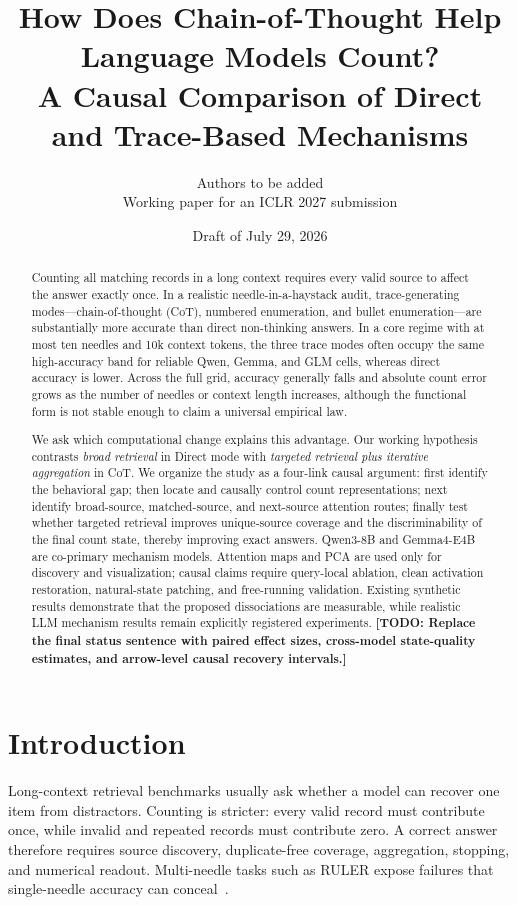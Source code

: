 \documentclass[11pt]{article}
\title{How Does Chain-of-Thought Help Language Models Count?\\
A Causal Comparison of Direct and Trace-Based Mechanisms}
\author{Authors to be added\\\small Working paper for an ICLR 2027 submission}
\date{Draft of July 29, 2026}
\newcommand{\inlineTODO}[1]{\textcolor{todored}{\textbf{[TODO: #1]}}}
\begin{document}
\maketitle

\begin{abstract}
Counting all matching records in a long context requires every valid source to affect the answer exactly once. In a realistic needle-in-a-haystack audit, trace-generating modes---chain-of-thought (CoT), numbered enumeration, and bullet enumeration---are substantially more accurate than direct non-thinking answers. In a core regime with at most ten needles and 10k context tokens, the three trace modes often occupy the same high-accuracy band for reliable Qwen, Gemma, and GLM cells, whereas direct accuracy is lower. Across the full grid, accuracy generally falls and absolute count error grows as the number of needles or context length increases, although the functional form is not stable enough to claim a universal empirical law.

We ask which computational change explains this advantage. Our working hypothesis contrasts \emph{broad retrieval} in Direct mode with \emph{targeted retrieval plus iterative aggregation} in CoT. We organize the study as a four-link causal argument: first identify the behavioral gap; then locate and causally control count representations; next identify broad-source, matched-source, and next-source attention routes; finally test whether targeted retrieval improves unique-source coverage and the discriminability of the final count state, thereby improving exact answers. Qwen3-8B and Gemma4-E4B are co-primary mechanism models. Attention maps and PCA are used only for discovery and visualization; causal claims require query-local ablation, clean activation restoration, natural-state patching, and free-running validation. Existing synthetic results demonstrate that the proposed dissociations are measurable, while realistic LLM mechanism results remain explicitly registered experiments. \inlineTODO{Replace the final status sentence with paired effect sizes, cross-model state-quality estimates, and arrow-level causal recovery intervals.}
\end{abstract}

\section{Introduction}

Long-context retrieval benchmarks usually ask whether a model can recover one item from distractors. Counting is stricter: every valid record must contribute once, while invalid and repeated records must contribute zero. A correct answer therefore requires source discovery, duplicate-free coverage, aggregation, stopping, and numerical readout. Multi-needle tasks such as RULER expose failures that single-needle accuracy can conceal~\citep{hsieh2024ruler}.
\end{document}
